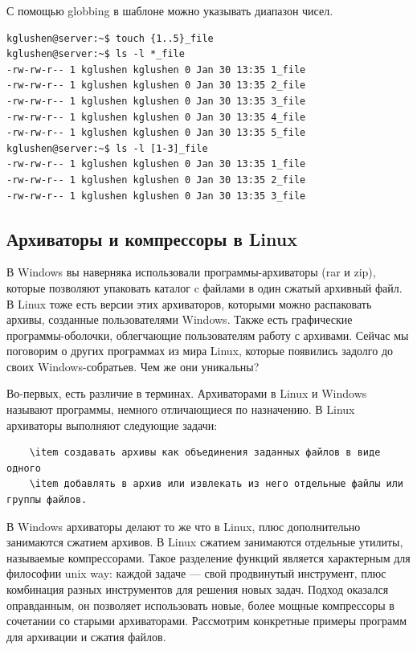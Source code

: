 \documentclass[14pt, a4paper]{article}
\begin{document}
С помощью globbing в шаблоне можно указывать диапазон чисел.

\begin{lstlisting}
kglushen@server:~$ touch {1..5}_file
kglushen@server:~$ ls -l *_file
-rw-rw-r-- 1 kglushen kglushen 0 Jan 30 13:35 1_file
-rw-rw-r-- 1 kglushen kglushen 0 Jan 30 13:35 2_file
-rw-rw-r-- 1 kglushen kglushen 0 Jan 30 13:35 3_file
-rw-rw-r-- 1 kglushen kglushen 0 Jan 30 13:35 4_file
-rw-rw-r-- 1 kglushen kglushen 0 Jan 30 13:35 5_file
kglushen@server:~$ ls -l [1-3]_file
-rw-rw-r-- 1 kglushen kglushen 0 Jan 30 13:35 1_file
-rw-rw-r-- 1 kglushen kglushen 0 Jan 30 13:35 2_file
-rw-rw-r-- 1 kglushen kglushen 0 Jan 30 13:35 3_file
\end{lstlisting}


\subsection*{Архиваторы и компрессоры в Linux}

В Windows вы наверняка использовали программы-архиваторы (rar и zip), которые позволяют
упаковать каталог c файлами в один сжатый архивный файл. В Linux тоже есть версии этих
архиваторов, которыми можно распаковать архивы, созданные пользователями Windows. Также есть
графические программы-оболочки, облегчающие пользователям работу с архивами. Сейчас мы
поговорим о других программах из мира Linux, которые появились задолго до своих
Windows-собратьев. Чем же они уникальны?

Во-первых, есть различие в терминах. Архиваторами в Linux и Windows называют программы,
немного отличающиеся по назначению. В Linux архиваторы выполняют следующие задачи:

\begin{lstlisting}
    \item создавать архивы как объединения заданных файлов в виде одного
    \item добавлять в архив или извлекать из него отдельные файлы или группы файлов.
\end{lstlisting}

В Windows архиваторы делают то же что в Linux, плюс дополнительно занимаются сжатием
архивов. В Linux сжатием занимаются отдельные утилиты, называемые компрессорами. Такое
разделение функций является характерным для философии unix way: каждой задаче — свой
продвинутый инструмент, плюс комбинация разных инструментов для решения новых задач. Подход
оказался оправданным, он позволяет использовать новые, более мощные компрессоры в сочетании
со старыми архиваторами. Рассмотрим конкретные примеры программ для архивации и сжатия
файлов.
\end{document}
